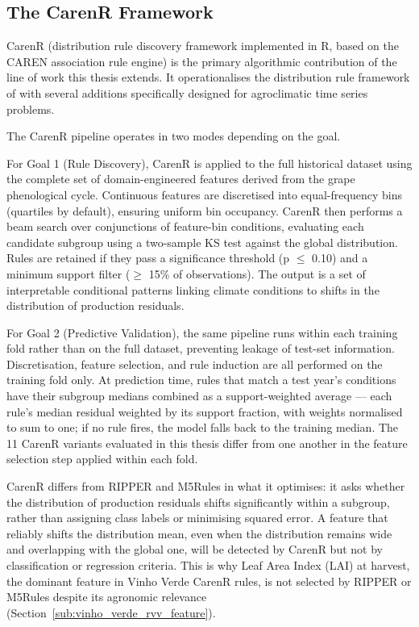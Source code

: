 \subsection{The CarenR Framework}\label{sub:the_carenr_framework}

CarenR (distribution rule discovery framework implemented in R, based on the CAREN association rule engine) is the primary algorithmic contribution of the line of work this thesis extends. It operationalises the distribution rule framework of \citet{Jorge2006} with several additions specifically designed for agroclimatic time series problems.

The CarenR pipeline operates in two modes depending on the goal.

For Goal 1 (Rule Discovery), CarenR is applied to the full historical dataset using the complete set of domain-engineered features derived from the grape phenological cycle. Continuous features are discretised into equal-frequency bins (quartiles by default), ensuring uniform bin occupancy. CarenR then performs a beam search over conjunctions of feature-bin conditions, evaluating each candidate subgroup using a two-sample KS test against the global distribution. Rules are retained if they pass a significance threshold (p $\leq$ 0.10) and a minimum support filter ($\geq$ 15\% of observations). The output is a set of interpretable conditional patterns linking climate conditions to shifts in the distribution of production residuals.

For Goal 2 (Predictive Validation), the same pipeline runs within each training fold rather than on the full dataset, preventing leakage of test-set information. Discretisation, feature selection, and rule induction are all performed on the training fold only. At prediction time, rules that match a test year's conditions have their subgroup medians combined as a support-weighted average --- each rule's median residual weighted by its support fraction, with weights normalised to sum to one; if no rule fires, the model falls back to the training median. The 11 CarenR variants evaluated in this thesis differ from one another in the feature selection step applied within each fold.

CarenR differs from RIPPER and M5Rules in what it optimises: it asks whether the distribution of production residuals shifts significantly within a subgroup, rather than assigning class labels or minimising squared error. A feature that reliably shifts the distribution mean, even when the distribution remains wide and overlapping with the global one, will be detected by CarenR but not by classification or regression criteria. This is why Leaf Area Index (LAI) at harvest, the dominant feature in Vinho Verde CarenR rules, is not selected by RIPPER or M5Rules despite its agronomic relevance (Section~\ref{sub:vinho_verde_rvv_feature}).

